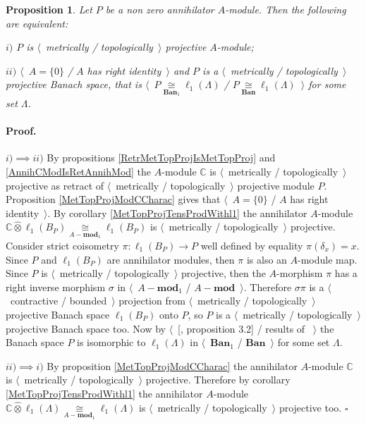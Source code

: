\documentclass[12pt]{article}
\newcommand{\projtens}{\mathbin{\widehat{\otimes}}}
\newcommand{\isom}[1]{\mathop{\mathbin{\cong}}\limits_{#1}}
\newtheorem{proposition}[theorem]{Proposition}
\renewenvironment{proof}{\paragraph{Proof.}}{\hfill$\square$\medskip}
\begin{document}
\begin{proposition}\label{MetTopProjOfAnnihModCharac} Let $P$ be a non zero  annihilator $A$-module. Then the following are equivalent:

$i)$ $P$ is $\langle$~metrically / topologically~$\rangle$ projective $A$-module;

$ii)$ $\langle$~$A=\{0\}$ / $A$ has right identity~$\rangle$ and $P$ is a $\langle$~metrically / topologically~$\rangle$ projective Banach space, that is $\langle$~$P\isom{\mathbf{Ban}_1}\ell_1(\Lambda)$ / $P\isom{\mathbf{Ban}}\ell_1(\Lambda)$~$\rangle$ for some set $\Lambda$.
\end{proposition}
\begin{proof} $i)$$\implies$$ ii)$ By propositions \ref{RetrMetTopProjIsMetTopProj} and \ref{AnnihCModIsRetAnnihMod} the $A$-module $\mathbb{C}$ is $\langle$~metrically / topologically~$\rangle$ projective as retract of $\langle$~metrically / topologically~$\rangle$ projective module $P$. Proposition \ref{MetTopProjModCCharac} gives that $\langle$~$A=\{0\}$ / $A$ has right identity~$\rangle$.  By corollary \ref{MetTopProjTensProdWithl1} the annihilator $A$-module $\mathbb{C}\projtens\ell_1(B_P)\isom{A-\mathbf{mod}_1}\ell_1(B_P)$ is $\langle$~metrically / topologically~$\rangle$ projective. Consider strict coisometry $\pi:\ell_1(B_P)\to P$ well defined by equality $\pi(\delta_x)=x$. Since $P$ and $\ell_1(B_P)$ are annihilator modules, then $\pi$ is also an $A$-module map. Since $P$ is $\langle$~metrically / topologically~$\rangle$ projective, then the $A$-morphism $\pi$ has a right inverse morphism $\sigma$ in $\langle$~$A-\mathbf{mod}_1$ / $A-\mathbf{mod}$~$\rangle$. Therefore $\sigma\pi$ is a $\langle$~contractive / bounded~$\rangle$ projection from $\langle$~metrically / topologically~$\rangle$ projective Banach space $\ell_1(B_P)$ onto $P$, so $P$ is a $\langle$~metrically / topologically~$\rangle$ projective Banach space too. Now by $\langle$~[\cite{HelMetrFrQMod}, proposition 3.2] / results of \cite{KotheTopProjBanSp}~$\rangle$ the Banach space $P$ is isomorphic to $\ell_1(\Lambda)$ in $\langle$~$\mathbf{Ban}_1$ / $\mathbf{Ban}$~$\rangle$ for some set $\Lambda$. 

$ii)$$\implies$$ i)$ By proposition \ref{MetTopProjModCCharac} the annihilator $A$-module $\mathbb{C}$ is $\langle$~metrically / topologically~$\rangle$ projective. Therefore by corollary \ref{MetTopProjTensProdWithl1} the annihilator $A$-module $\mathbb{C}\projtens\ell_1(\Lambda)\isom{A-\mathbf{mod}_1}\ell_1(\Lambda)$ is $\langle$~metrically / topologically~$\rangle$ projective too.
\end{proof}
\end{document}

